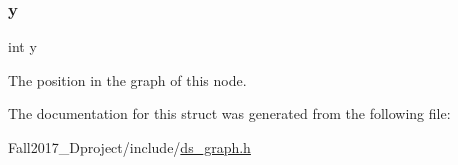 \mbox{\label{structgraphnode__s_a0a2f84ed7838f07779ae24c5a9086d33}} 
\subsubsection{\texorpdfstring{y}{y}}
{\footnotesize\ttfamily int y}



The position in the graph of this node. 



The documentation for this struct was generated from the following file\+:\begin{DoxyCompactItemize}
\item 
Fall2017\+\_\+Dproject/include/\hyperlink{ds__graph_8h}{ds\+\_\+graph.\+h}\end{DoxyCompactItemize}
